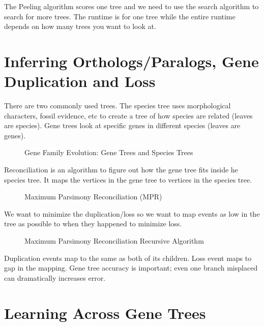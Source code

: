 \noindent The Peeling algorithm scores one tree and we need to use the
search algorithm to search for more trees. The runtime is for one tree
while the entire runtime depends on how many trees you want to look
at.

\section{Inferring Orthologs/Paralogs, Gene Duplication and Loss}

\noindent There are two commonly used trees. The species tree uses
morphological characters, fossil evidence, etc to create a tree of how
species are related (leaves are species). Gene trees look at specific
genes in different species (leaves are genes).

\begin{figure}[ht!]
  \centering
  \caption{Gene Family Evolution: Gene Trees and Species Trees}
  \label{Fig07_GeneFamilyEvolution}
\end{figure}

\noindent Reconciliation is an algorithm to figure out how the gene tree fits inside  he species tree. It maps the vertices in the gene tree to vertices in the species tree. 

\begin{figure}[ht!]
  \centering
  \caption{Maximum Parsimony Reconciliation (MPR) } 
  \label{Fig08_MaximumParsimonyReconciliation}
\end{figure}

\noindent We want to minimize the duplication/loss so we want to map
events as low in the tree as possible to when they happened to
minimize loss.

\begin{figure}[ht!]
  \centering
  \caption{Maximum Parsimony Reconciliation Recursive Algorithm} 
  \label{Fig09_MPRAlgorithm}
\end{figure}

Duplication events map to the same as both of its children. Loss event
maps to gap in the mapping. Gene tree accuracy is important; even one
branch misplaced can dramatically increases error.

\section{Learning Across Gene Trees}

